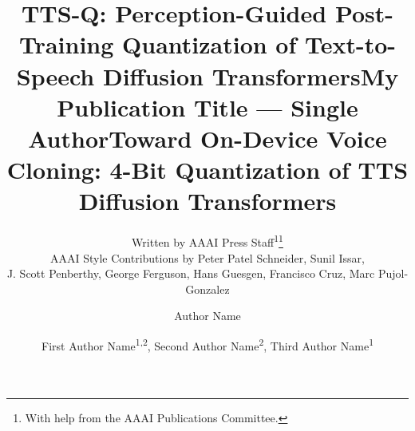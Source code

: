 \documentclass[letterpaper]{article} %
\title{TTS-Q: Perception-Guided Post-Training Quantization of Text-to-Speech Diffusion Transformers}
\author{
    Written by AAAI Press Staff\textsuperscript{\rm 1}\thanks{With help from the AAAI Publications Committee.}\\
    AAAI Style Contributions by Peter Patel Schneider,
    Sunil Issar,\\
    J. Scott Penberthy,
    George Ferguson,
    Hans Guesgen,
    Francisco Cruz\equalcontrib\corresponding,
    Marc Pujol-Gonzalez\equalcontrib\corresponding
}
\title{My Publication Title --- Single Author}
\author {
    Author Name
}
\title{Toward On-Device Voice Cloning: 4-Bit Quantization of TTS Diffusion Transformers}
\author {
    First Author Name\textsuperscript{\rm 1,\rm 2}\equalcontrib,
    Second Author Name\textsuperscript{\rm 2}\equalcontrib,
    Third Author Name\textsuperscript{\rm 1}\corresponding
}
\begin{document}
\maketitle

\begin{abstract}

\end{abstract}














% 
\end{document}
